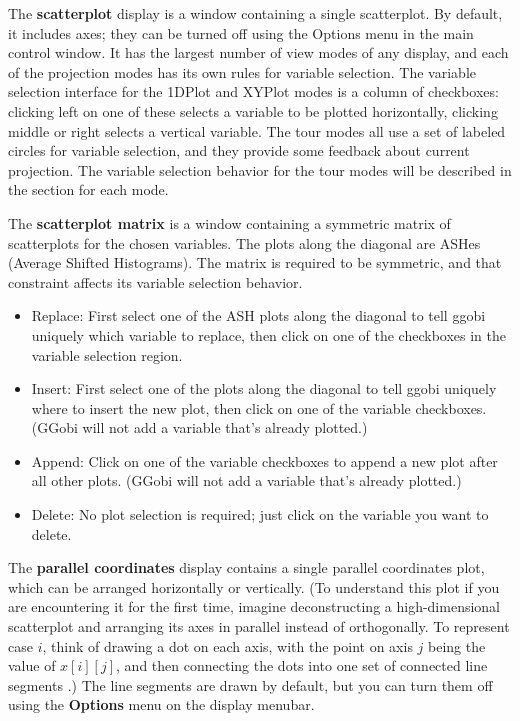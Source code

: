 \documentclass[11pt]{article}
\begin{document}
The {\bf scatterplot} display is a window containing a single
scatterplot.  By default, it includes axes; they can be turned off
using the Options menu in the main control window.  It has the
largest number of view modes of any display, and each of the
projection modes has its own rules for variable selection.  The
variable selection interface for the 1DPlot and XYPlot modes is a
column of checkboxes: clicking left on one of these selects a
variable to be plotted horizontally, clicking middle or right selects
a vertical variable.  The tour modes all use a set of labeled
circles for variable selection, and they provide some feedback about
current projection.  The variable selection behavior for the tour
modes will be described in the section for each mode.

The {\bf scatterplot matrix} is a window containing a symmetric matrix
of scatterplots for the chosen variables.  The plots along the diagonal
are ASHes (Average Shifted Histograms).  The matrix is required to be
symmetric, and that constraint affects its variable selection behavior.

\begin{itemize}
\item Replace:  First select one of the ASH plots along the diagonal
  to tell ggobi uniquely which variable to replace, then click on
  one of the checkboxes in the variable selection region.
\item Insert:  First select one of the plots along the
  diagonal to tell ggobi uniquely where to insert the new plot,
  then click on one of the variable checkboxes.  (GGobi will
  not add a variable that's already plotted.)
\item Append:  Click on one of the variable checkboxes to append
  a new plot after all other plots.  (GGobi will not add a variable
  that's already plotted.)
\item Delete:  No plot selection is required; just click on the
  variable you want to delete.
\end{itemize}

The {\bf parallel coordinates} display contains a single parallel
coordinates plot, which can be arranged horizontally or vertically.
(To understand this plot if you are encountering it for the first
time, imagine deconstructing a high-dimensional scatterplot and
arranging its axes in parallel instead of orthogonally.  To represent
case $i$, think of drawing a dot on each axis,  with the point on
axis $j$ being the value of $x[i][j]$, and then connecting the dots
into one set of connected line segments \cite{In85,We90}.)  The line
segments are drawn by default, but you can turn them off using the
{\bf Options} menu on the display menubar.
\end{document}
